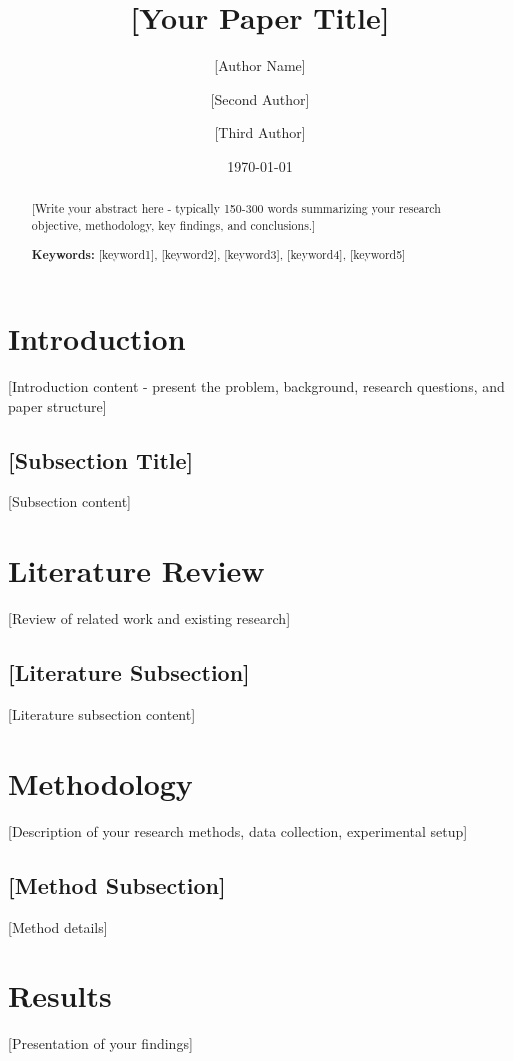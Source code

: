 \documentclass[12pt,a4paper]{article}
\title{[Your Paper Title]}
\author{[Author Name] \and [Second Author] \and [Third Author]}
\date{\today}
\begin{document}
\maketitle
\thispagestyle{empty}

\begin{abstract}
[Write your abstract here - typically 150-300 words summarizing your research objective, methodology, key findings, and conclusions.]

\textbf{Keywords:} [keyword1], [keyword2], [keyword3], [keyword4], [keyword5]
\end{abstract}

\newpage
\tableofcontents
\newpage

\twocolumn
\section{Introduction}
[Introduction content - present the problem, background, research questions, and paper structure]

\subsection{[Subsection Title]}
[Subsection content]

\section{Literature Review}
[Review of related work and existing research]

\subsection{[Literature Subsection]}
[Literature subsection content]

\section{Methodology}
[Description of your research methods, data collection, experimental setup]

\subsection{[Method Subsection]}
[Method details]

\section{Results}
[Presentation of your findings]
\end{document}
